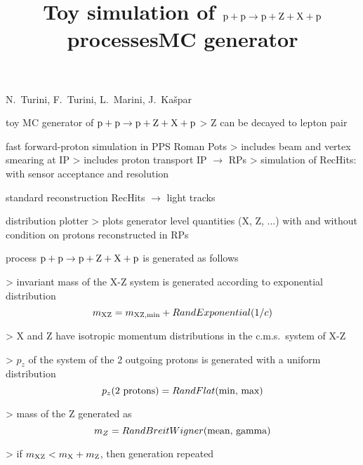 


\newpage %

\def\author{PPS}
\def\caption{PPXZ generator}
\def\date{19 Oct 2018}

\newpage %
\hbox{}
\vfil
\title{Toy simulation of $\rm p + p \rightarrow p + Z + X + p$ processes}
\vskip3mm
\centerline{N.~Turini, F.~Turini, L.~Marini, J.~Ka\v spar}
\vfil


\newpage %

\> toy MC generator of $\rm p + p \rightarrow p + Z + X + p$
\>> Z can be decayed to lepton pair

\> fast forward-proton simulation in PPS Roman Pots
\>> includes beam and vertex smearing at IP
\>> includes proton transport IP $\rightarrow$ RPs
\>> simulation of RecHits: with sensor acceptance and resolution

\> standard reconstruction RecHits $\rightarrow$ light tracks

\> distribution plotter
\>> plots generator level quantities (X, Z, ...) with and without condition on protons reconstructed in RPs



\newpage %
\title{MC generator}

\> process $\rm p + p \rightarrow p + Z + X + p$ is generated as follows

\>> invariant mass of the X-Z system is generated according to exponential distribution
\vskip-3mm
\cThird
$$m_{\rm XZ} = m_{\rm XZ,min} + RandExponential(1/c)$$
\vskip2mm

\>> X and Z have isotropic momentum distributions in the c.m.s.~system of X-Z

\>> $p_z$ of the system of the 2 outgoing protons is generated with a uniform distribution
\cThird
\vskip-2mm
$$p_z(\hbox{2 protons}) = RandFlat(\hbox{min, max})$$
\vskip2mm

\>> mass of the Z generated as
\cThird
\vskip-2mm
$$m_Z = RandBreitWigner(\hbox{mean, gamma})$$
\vskip2mm

\>> if $m_{\rm XZ} < m_{\rm X} + m_{\rm Z}$, then generation repeated

